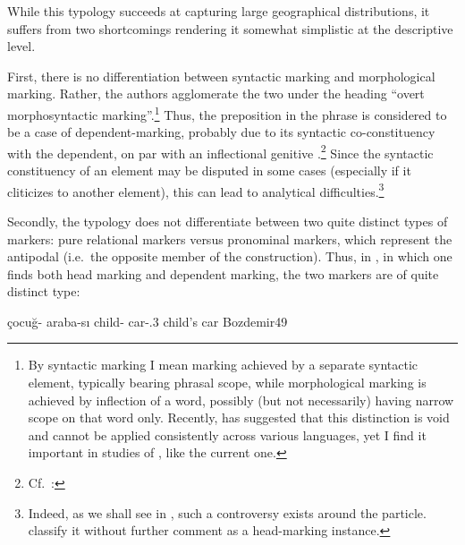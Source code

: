 \newpage 
While this typology succeeds  at capturing large geographical distributions, it suffers from two shortcomings rendering it somewhat simplistic at the descriptive level. 

First, there is no differentiation between syntactic marking and morphological  marking. Rather, the authors agglomerate the two under the heading \enquote{overt morphosyntactic marking}.\footnote{By syntactic marking I mean marking achieved by a separate syntactic element, typically bearing phrasal scope, while morphological marking is achieved by inflection of a word, possibly (but not necessarily) having narrow scope on that word only. Recently, \citet{HaspelmathWord} has suggested that this distinction is void and cannot be applied consistently across various languages, yet I find it important in studies of , like the current one.} 
Thus, the preposition  in the  phrase  is considered to be a case of dependent-marking, probably due to its syntactic co-constituency with the dependent, on par with an inflectional genitive .\footnote{Cf.\  \citet[36]{Fairbanks}: } Since the syntactic constituency of an element may be disputed in some cases (especially if it cliticizes to another element), this can lead to analytical difficulties.\footnote{Indeed, as we shall see in , such a controversy exists around the \Per \ez* particle. \citet{NicholsBickelWals}  classify it without further comment as a head-marking instance.} 

Secondly, the typology does not differentiate between two quite distinct types of markers:  pure relational markers versus pronominal markers, which represent the antipodal  (i.e.\ the opposite member of the construction). Thus, in , in which one finds both head marking and dependent marking, the two markers are of quite distinct type:


{çocuğ- araba-sı}
{child-\opt\gen{} car-\poss.3 }
{ child's car}
{Bozdemir}{49}

